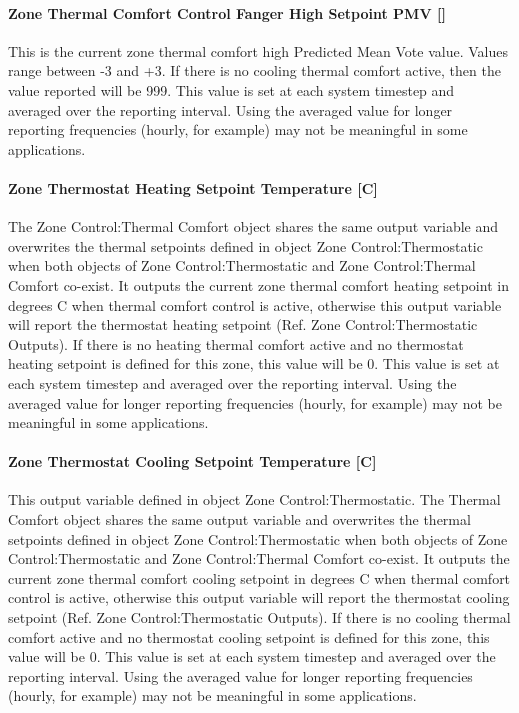 \paragraph{Zone Thermal Comfort Control Fanger High Setpoint PMV {[]}}\label{zone-thermal-comfort-control-fanger-high-setpoint-pmv}

This is the current zone thermal comfort high Predicted Mean Vote value. Values range between -3 and +3. If there is no cooling thermal comfort active, then the value reported will be 999. This value is set at each system timestep and averaged over the reporting interval. Using the averaged value for longer reporting frequencies (hourly, for example) may not be meaningful in some applications.

\paragraph{Zone Thermostat Heating Setpoint Temperature {[}C{]}}\label{zone-thermostat-heating-setpoint-temperature-c-1}

The Zone Control:Thermal Comfort object shares the same output variable and overwrites the thermal setpoints defined in object Zone Control:Thermostatic when both objects of Zone Control:Thermostatic and Zone Control:Thermal Comfort co-exist. It outputs the current zone thermal comfort heating setpoint in degrees C when thermal comfort control is active, otherwise this output variable will report the thermostat heating setpoint (Ref. Zone Control:Thermostatic Outputs). If there is no heating thermal comfort active and no thermostat heating setpoint is defined for this zone, this value will be 0. This value is set at each system timestep and averaged over the reporting interval. Using the averaged value for longer reporting frequencies (hourly, for example) may not be meaningful in some applications.

\paragraph{Zone Thermostat Cooling Setpoint Temperature {[}C{]}}\label{zone-thermostat-cooling-setpoint-temperature-c-1}

This output variable defined in object Zone Control:Thermostatic. The Thermal Comfort object shares the same output variable and overwrites the thermal setpoints defined in object Zone Control:Thermostatic when both objects of Zone Control:Thermostatic and Zone Control:Thermal Comfort co-exist. It outputs the current zone thermal comfort cooling setpoint in degrees C when thermal comfort control is active, otherwise this output variable will report the thermostat cooling setpoint (Ref. Zone Control:Thermostatic Outputs). If there is no cooling thermal comfort active and no thermostat cooling setpoint is defined for this zone, this value will be 0. This value is set at each system timestep and averaged over the reporting interval. Using the averaged value for longer reporting frequencies (hourly, for example) may not be meaningful in some applications.

